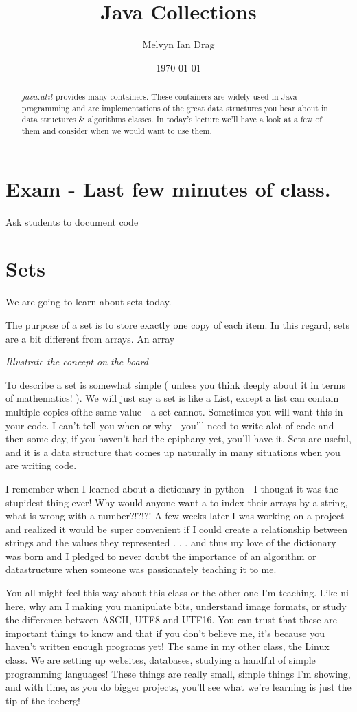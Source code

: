 \documentclass[12pt]{article}
\title{Java Collections}
\author{
	Melvyn Ian Drag
}
\date{\today}
\begin{document}
\maketitle

\begin{abstract}
$java.util$ provides many containers. These containers are widely used in Java programming and are implementations of the great data structures you hear about in data structures \& algorithms classes. In today's lecture we'll have a look at a few of them and consider when we would want to use them.
\end{abstract}

\section{Exam - Last few minutes of class.}
Ask students to document code
\section{Sets}
We are going to learn about sets today.

The purpose of a set is to store exactly one copy of each item. In this regard, sets are a bit different from arrays. An array 

\textit{Illustrate the concept on the board}

To describe a set is somewhat simple ( unless you think deeply about it in terms of mathematics! ). We will just say a set is like a List, except a list can contain multiple copies ofthe same value - a set cannot. Sometimes you will want this in your code. I can't tell you when or why - you'll need to write alot of code and then some day, if you haven't had the epiphany yet, you'll have it. Sets are useful, and it is a data structure that comes up naturally in many situations when you are writing code. 

I remember when I learned about a dictionary in python - I thought it was the stupidest thing ever! Why would anyone want a to index their arrays by a string, what is wrong with a number?!?!?! A few weeks later I was working on a project and realized it would be super convenient if I could create a relationship between strings and the values they represented . . . and thus my love of the dictionary was born and I pledged to never doubt the importance of an algorithm or datastructure when someone was passionately teaching it to me.

You all might feel this way about this class or the other one I'm teaching. Like ni here, why am I making you manipulate bits, understand image formats, or study the difference between ASCII, UTF8 and UTF16. You can trust that these are important things to know and that if you don't believe me, it's because you haven't written enough programs yet! The same in my other class, the Linux class. We are setting up websites, databases, studying a handful of simple programming languages! These things are really small, simple things I'm showing, and with time, as you do bigger projects, you'll see what we're learning is just the tip of the iceberg!
\end{document}

